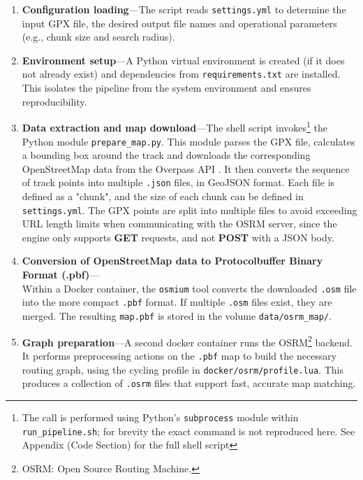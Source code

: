 \documentclass[12pt,a4paper]{article}
\begin{document}
\begin{enumerate}
	\item \textbf{Configuration loading}---The script reads \texttt{settings.yml}
	      to determine the input GPX file, the desired output file names and
	      operational parameters (e.g., chunk size and search radius).
	\item \textbf{Environment setup}---A Python virtual environment is created (if
	      it does not already exist) and dependencies from
	      \texttt{requirements.txt} are installed.  This isolates the pipeline from
	      the system environment and ensures reproducibility.
	\item \textbf{Data extraction and map download}---The shell script
	      invokes\footnote{The call is performed using Python's
		      \texttt{subprocess} module within \texttt{run\_pipeline.sh}; for brevity
		      the exact command is not reproduced here. See Appendix (Code Section) for the full shell script}
	      the Python module \texttt{prepare\_map.py}.  This module parses the GPX file,
	      calculates a bounding box around the track and downloads the
	      corresponding OpenStreetMap data from the Overpass API
	      \cite{overpass}.  It then converts the sequence of track points into
	      multiple \texttt{.json} files, in GeoJSON format. Each file is defined as a "chunk", and
	      the size of each chunk can be defined in \texttt{settings.yml}. The GPX points are split into multiple files to avoid
	      exceeding URL length limits when communicating with the OSRM server, since the engine only
	      supports \textbf{GET} requests, and not \textbf{POST} with a JSON body.
	\item \textbf{Conversion of OpenStreetMap data to Protocolbuffer Binary Format (.pbf)}---\\Within a Docker
	      container, the \texttt{osmium} tool converts the downloaded
	      \texttt{.osm} file into the more compact \texttt{.pbf} format.  If
	      multiple \texttt{.osm} files exist, they are merged.  The resulting
	      \texttt{map.pbf} is stored in the volume \texttt{data/osrm\_map/}.
	\item \textbf{Graph preparation}---A second docker container runs the
	      OSRM\footnote{OSRM: Open Source Routing Machine.} backend.  It
	      performs preprocessing actions on the \texttt{.pbf} map to build the necessary routing
	      graph, using the cycling profile in \texttt{docker/osrm/profile.lua}.
	      This produces a collection of \texttt{.osrm} files that support fast, accurate
	      map matching.

\end{enumerate}
\end{document}
